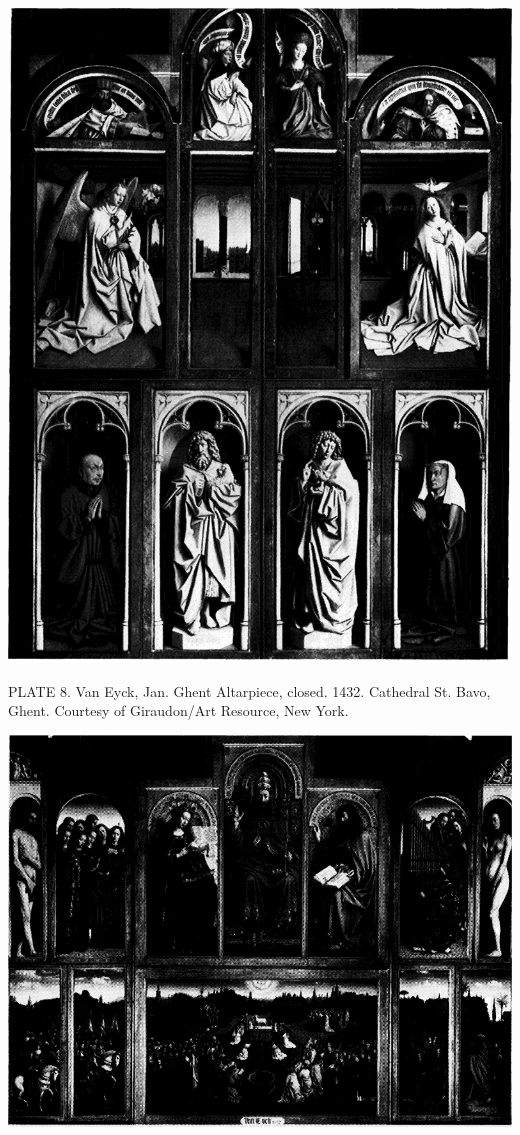 \protect\hypertarget{20_ILLUSTRATIONS_FOLLOW_PAGE.xhtmlux5cux23id_8}{}{}\includegraphics{include/html/images/328_1.png}

PLATE 8. Van Eyck, Jan. Ghent Altarpiece, closed. 1432. Cathedral St.
Bavo, Ghent. Courtesy of Giraudon/Art Resource, New York.

\protect\hypertarget{20_ILLUSTRATIONS_FOLLOW_PAGE.xhtmlux5cux23id_9}{}{}\includegraphics{include/html/images/329_1.png}

